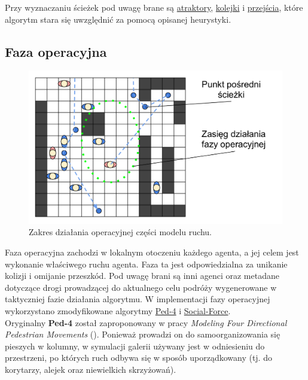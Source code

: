 \documentclass[a4paper, 12pt]{article}
\begin{document}
Przy wyznaczaniu ścieżek pod uwagę brane są \hyperref[sec:attractors]{atraktory}, \hyperref[sec:queues]{kolejki} i \hyperref[sec:entrance-exits]{przejścia}, które algorytm stara się uwzględnić za pomocą opisanej heurystyki.

\newpage
        \subsection{Faza operacyjna}
        \label{sec:operational}

        \begin{figure}[H]
            \centering
            \includegraphics[scale=0.3]{./img/Operative.pdf}
            \caption{Zakres działania operacyjnej części modelu ruchu.}
            \label{fig:operational}
        \end{figure}


\noindent
Faza operacyjna zachodzi w lokalnym otoczeniu każdego agenta, a jej celem jest wykonanie właściwego ruchu agenta. Faza ta jest odpowiedzialna za unikanie kolizji i omijanie przeszkód. Pod uwagę brani są inni agenci oraz metadane dotyczące drogi prowadzącej do aktualnego celu podróży wygenerowane w taktyczniej fazie działania algorytmu. W implementacji fazy operacyjnej wykorzystano zmodyfikowane algorytmy \hyperref[sec:ped-4-impl]{Ped-4} i \hyperref[sec:social-force-impl]{Social-Force}. \\

Oryginalny \textbf{Ped-4} został zaproponowany w pracy \textit{Modeling Four Directional Pedestrian Movements} (\cite{refs:4-way-movement}). Ponieważ prowadzi on do samoorganizowania się pieszych w kolumny, w symulacji galerii używany jest w odniesieniu do przestrzeni, po których ruch odbywa się w sposób uporządkowany (tj. do korytarzy, alejek oraz niewielkich skrzyżowań). \\
\end{document}
